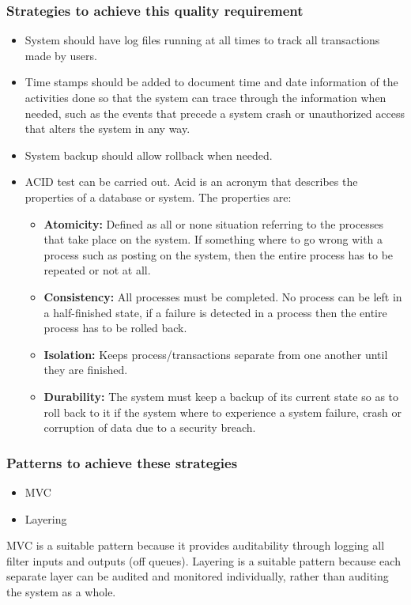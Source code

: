 \documentclass[a4paper,12pt]{article}
\begin{document}
 \subsubsection{Strategies to achieve this quality requirement}
 \begin{itemize}
 \item System should have log files running at all times to track all transactions made by users. 
 \item Time stamps should be added to document time and date information of the activities done so that the system can trace through the information when needed, such as the events that precede a system crash or unauthorized access
that alters the system in any way.
\item System backup should allow rollback when needed.
\item ACID test can be carried out. Acid is an acronym that describes the properties of a database or system. The properties are:
	\begin{itemize}
	\item \textbf{Atomicity:} Defined as all or none situation referring to the processes that take place on the 
	   system. If something where to go wrong with a process such as posting on the system,
	   then the entire process has to be repeated or not at all.
	\item \textbf{Consistency:} All processes must be completed. No process can be left in a half-finished state,
	     if a failure is detected in a process then the entire process has to be rolled back.
	\item \textbf{Isolation:} Keeps process/transactions separate from one another until they are finished.
	\item \textbf{Durability:} The system must keep a backup of its current state so as to roll back to it if
	    the system where to experience a system failure, crash or corruption of data due
	    to a security breach.
	\end{itemize}
 \end{itemize}

 \subsubsection{Patterns to achieve these strategies}
 \begin{itemize}
 \item MVC
 \item Layering
\end{itemize} 
 MVC is a suitable pattern because it provides auditability through logging all filter inputs and outputs (off queues). Layering is a suitable pattern because each separate layer can be audited and monitored individually, rather than auditing the system as a whole.
  
\end{document}
